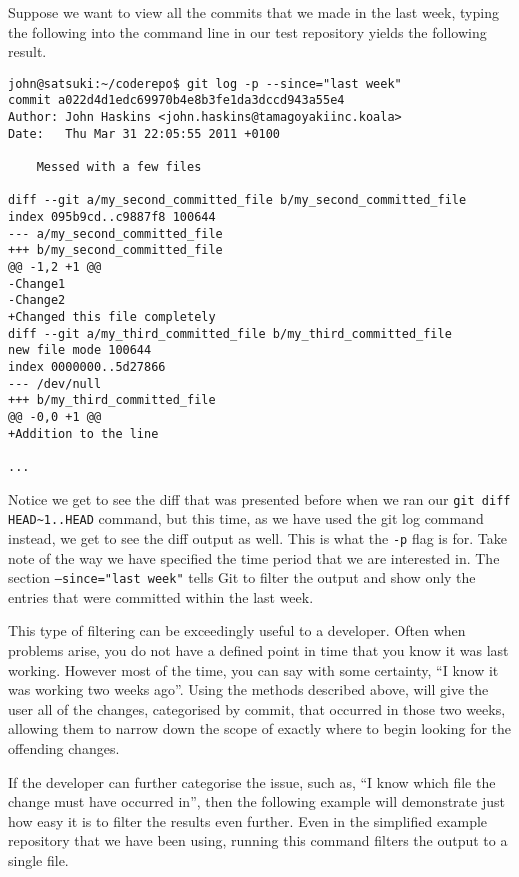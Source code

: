 Suppose we want to view all the commits that we made in the last week, typing the following into the command line in our test repository yields the following result.

\begin{Verbatim}
john@satsuki:~/coderepo$ git log -p --since="last week"
commit a022d4d1edc69970b4e8b3fe1da3dccd943a55e4
Author: John Haskins <john.haskins@tamagoyakiinc.koala>
Date:   Thu Mar 31 22:05:55 2011 +0100

    Messed with a few files

diff --git a/my_second_committed_file b/my_second_committed_file
index 095b9cd..c9887f8 100644
--- a/my_second_committed_file
+++ b/my_second_committed_file
@@ -1,2 +1 @@
-Change1
-Change2
+Changed this file completely
diff --git a/my_third_committed_file b/my_third_committed_file
new file mode 100644
index 0000000..5d27866
--- /dev/null
+++ b/my_third_committed_file
@@ -0,0 +1 @@
+Addition to the line

...
\end{Verbatim}

Notice we get to see the diff that was presented before when we ran our \texttt{git diff HEAD\textasciitilde1..HEAD} command, but this time, as we have used the git log command instead, we get to see the diff output as well.  This is what the \texttt{-p} flag is for.  Take note of the way we have specified the time period that we are interested in.  The section \texttt{--since="last week"} tells Git to filter the output and show only the entries that were committed within the last week.

This type of filtering can be exceedingly useful to a developer.  Often when problems arise, you do not have a defined point in time that you know it was last working.  However most of the time, you can say with some certainty, ``I know it was working two weeks ago''.  Using the methods described above, will give the user all of the changes, categorised by commit, that occurred in those two weeks, allowing them to narrow down the scope of exactly where to begin looking for the offending changes.

If the developer can further categorise the issue, such as, ``I know which file the change must have occurred in'', then the following example will demonstrate just how easy it is to filter the results even further.  Even in the simplified example repository that we have been using, running this command filters the output to a single file.

